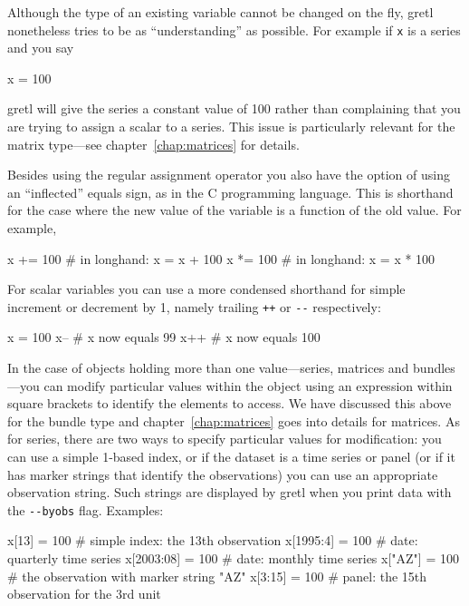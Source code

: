 Although the type of an existing variable cannot be changed on the
fly, gretl nonetheless tries to be as ``understanding'' as
possible. For example if \texttt{x} is a series and you say

\begin{code}
x = 100
\end{code} 

gretl will give the series a constant value of 100 rather than
complaining that you are trying to assign a scalar to a series. This
issue is particularly relevant for the matrix type---see
chapter~\ref{chap:matrices} for details.

Besides using the regular assignment operator you also have the option
of using an ``inflected'' equals sign, as in the C programming
language. This is shorthand for the case where the new value of the
variable is a function of the old value. For example,

\begin{code}
x += 100 # in longhand: x = x + 100
x *= 100 # in longhand: x = x * 100
\end{code} 

For scalar variables you can use a more condensed shorthand for simple
increment or decrement by 1, namely trailing \texttt{++} or \verb|--|
respectively:

\begin{code}
x = 100
x--     # x now equals 99
x++     # x now equals 100
\end{code}

In the case of objects holding more than one value---series, matrices
and bundles---you can modify particular values within the object using
an expression within square brackets to identify the elements to
access. We have discussed this above for the bundle type and
chapter~\ref{chap:matrices} goes into details for matrices. As for
series, there are two ways to specify particular values for
modification: you can use a simple 1-based index, or if the dataset is
a time series or panel (or if it has marker strings that identify the
observations) you can use an appropriate observation string. Such
strings are displayed by gretl when you print data with the
\verb|--byobs| flag. Examples:

\begin{code}
x[13]      = 100  # simple index: the 13th observation
x[1995:4]  = 100  # date: quarterly time series
x[2003:08] = 100  # date: monthly time series
x["AZ"]    = 100  # the observation with marker string "AZ"
x[3:15]    = 100  # panel: the 15th observation for the 3rd unit
\end{code}


